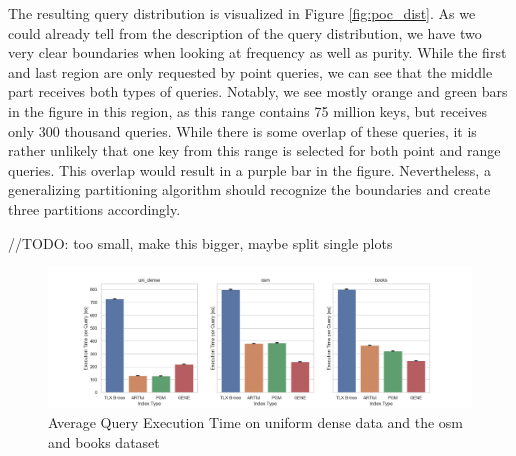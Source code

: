The resulting query distribution is visualized in Figure \ref{fig:poc_dist}. As we could already tell from the description of the query distribution, we have two very clear boundaries when looking at frequency as well as purity. While the first and last region are only requested by point queries, we can see that the middle part receives both types of queries. Notably, we see mostly orange and green bars in the figure in this region, as this range contains 75 million keys, but receives only 300 thousand queries. While there is some overlap of these queries, it is rather unlikely that one key from this range is selected for both point and range queries. This overlap would result in a purple bar in the figure. Nevertheless, a generalizing partitioning algorithm should recognize the boundaries and create three partitions accordingly.


//TODO: too small, make this bigger, maybe split single plots
\begin{figure}
    \centering
    \includegraphics[width=\textwidth]{figures/poc_times.png}
    \caption{Average Query Execution Time on uniform dense data and the osm and books dataset}
    \label{fig:poc_times}
\end{figure}

